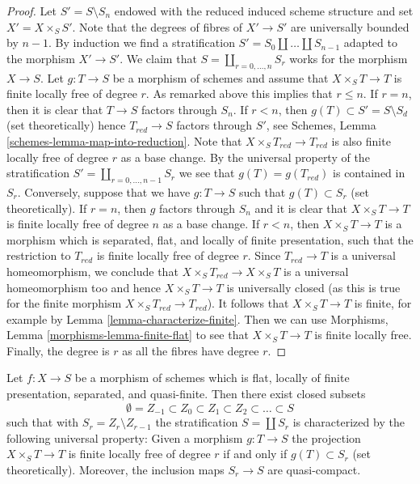 \begin{proof}
\medskip\noindent
Let $S' = S \setminus S_n$ endowed with the reduced induced scheme
structure and set $X' = X \times_S S'$. Note that the degrees of fibres
of $X' \to S'$ are universally bounded by $n - 1$. By induction we find a
stratification $S' = S_0 \amalg \ldots \amalg S_{n - 1}$ adapted
to the morphism $X' \to S'$. We claim that $S = \coprod_{r = 0, \ldots, n} S_r$
works for the morphism $X \to S$. Let $g : T \to S$ be a morphism of schemes
and assume that $X \times_S T \to T$ is finite locally free of degree $r$.
As remarked above this implies that $r \leq n$. If $r = n$, then it is
clear that $T \to S$ factors through $S_n$. If $r < n$, then
$g(T) \subset S' = S \setminus S_d$ (set theoretically) hence
$T_{red} \to S$ factors through $S'$, see
Schemes, Lemma \ref{schemes-lemma-map-into-reduction}.
Note that $X \times_S T_{red} \to T_{red}$ is also
finite locally free of degree $r$ as a base change.
By the universal property of the stratification
$S' = \coprod_{r = 0, \ldots, n - 1} S_r$ we see that $g(T) = g(T_{red})$
is contained in $S_r$.
Conversely, suppose that we have $g : T \to S$ such that
$g(T) \subset S_r$ (set theoretically).
If $r = n$, then $g$ factors through $S_n$ and
it is clear that $X \times_S T \to T$
is finite locally free of degree $n$ as a base change.
If $r < n$, then $X \times_S T \to T$ is a morphism which is
separated, flat, and locally of finite presentation, such that
the restriction to $T_{red}$ is finite locally free of degree $r$.
Since $T_{red} \to T$ is a universal homeomorphism, we conclude
that $X \times_S T_{red} \to X \times_S T$ is a universal homeomorphism
too and hence $X \times_S T \to T$ is universally closed (as this
is true for the finite morphism $X \times_S T_{red} \to T_{red}$).
It follows that $X \times_S T \to T$ is finite, for example by
Lemma \ref{lemma-characterize-finite}. Then we can use
Morphisms, Lemma \ref{morphisms-lemma-finite-flat}
to see that $X \times_S T \to T$ is finite locally free.
Finally, the degree is $r$ as all the fibres have degree $r$.
\end{proof}

\begin{lemma}
\label{lemma-stratify-flat-fp-qf}
Let $f : X \to S$ be a morphism of schemes which is flat, locally of
finite presentation, separated, and quasi-finite. Then there exist
closed subsets
$$
\emptyset = Z_{-1} \subset Z_0 \subset Z_1 \subset Z_2 \subset
\ldots \subset S
$$
such that with $S_r = Z_r \setminus Z_{r - 1}$ the stratification
$S = \coprod S_r$ is characterized by the following universal property:
Given a morphism $g : T \to S$ the projection $X \times_S T \to T$ is
finite locally free of degree $r$ if and only if $g(T) \subset S_r$
(set theoretically). Moreover, the inclusion maps $S_r \to S$ are
quasi-compact.
\end{lemma}

